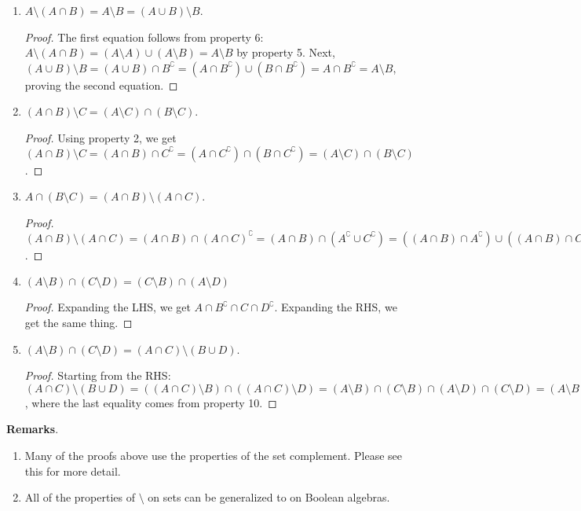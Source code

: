 \documentclass[12pt]{article}
\begin{document}
\begin{enumerate}
\begin{proof} These laws follow from property 2 and the de Morgan's laws on set complement.  For example, $A\setminus (B\cap C)=(A\setminus B)\cup (A\setminus C) = A\cap (B\cap C)^\complement = A\cap (B^\complement \cup C^\complement) = (A\cap B^\complement) \cup (A\cap C^\complement) = (A\setminus B)\cup (A\setminus C)$.  The other equation is proved similarly.
\end{proof}
\item $A\setminus(A\cap B) = A\setminus B = (A\cup B)\setminus B$.
\begin{proof}  The first equation follows from property 6: $A\setminus (A\cap B)=(A\setminus A)\cup (A\setminus B)= A\setminus B$ by property 5.  Next, $(A\cup B)\setminus B=(A\cup B)\cap B^\complement = (A\cap B^\complement)\cup (B\cap B^\complement)= A\cap B^\complement =A\setminus B$, proving the second equation.
\end{proof}
\item $(A\cap B)\setminus C=(A\setminus C)\cap (B\setminus C)$.
\begin{proof}  Using property 2, we get $(A\cap B)\setminus C=(A\cap B)\cap C^\complement = (A\cap C^\complement)\cap (B\cap C^\complement) = (A\setminus C)\cap (B\setminus C)$.
\end{proof}
\item $A\cap (B\setminus C)=(A\cap B)\setminus (A\cap C)$.
\begin{proof} $(A\cap B)\setminus (A\cap C) = (A\cap B)\cap (A\cap C)^\complement = (A\cap B)\cap (A^\complement \cup C^\complement) = ((A\cap B)\cap A^\complement)\cup ((A\cap B)\cap C^\complement) = (A\cap B)\cap C^\complement = A\cap (B\cap C^\complement) = A\cap (B\setminus C)$.
\end{proof}
\item $(A\setminus B)\cap (C\setminus D) = (C\setminus B)\cap (A\setminus D)$
\begin{proof} Expanding the LHS, we get $A\cap B^\complement \cap C \cap D^\complement$.  Expanding the RHS, we get the same thing.
\end{proof}
\item $(A\setminus B)\cap (C\setminus D) = (A\cap C)\setminus (B\cup D)$.
\begin{proof}  Starting from the RHS: $(A\cap C)\setminus (B\cup D)=((A\cap C)\setminus B)\cap ((A\cap C)\setminus D)=(A\setminus B)\cap (C\setminus B)\cap (A\setminus D)\cap (C\setminus D)=(A\setminus B)\cap (C\setminus D)$, where the last equality comes from property 10.
\end{proof}
\end{enumerate}

\textbf{Remarks}.  
\begin{enumerate}
\item
Many of the proofs above use the properties of the set complement.  Please see this  for more detail.
\item
All of the properties of $\setminus$ on sets can be generalized to  on Boolean algebras.
\end{enumerate}
\end{document}
